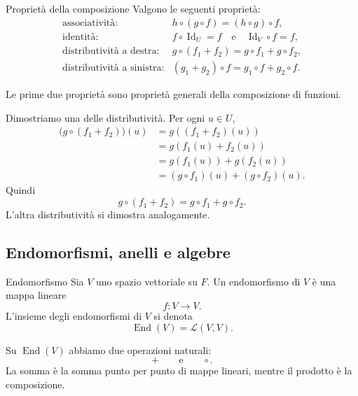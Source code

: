 \documentclass[a4paper]{article}
\begin{document}
\begin{snippetproposition}{Proprietà della composizione}
    Valgono le seguenti proprietà:
    \[
        \begin{array}{ll}
            \text{associatività:} &
            h\circ(g\circ f)=(h\circ g)\circ f,\\[2mm]
            \text{identità:} &
            f\circ\operatorname{Id}_U=f
            \quad\text{e}\quad
            \operatorname{Id}_V\circ f=f,\\[2mm]
            \text{distributività a destra:} &
            g\circ(f_1+f_2)=g\circ f_1+g\circ f_2,\\[2mm]
            \text{distributività a sinistra:} &
            (g_1+g_2)\circ f=g_1\circ f+g_2\circ f.
        \end{array}
    \]
\end{snippetproposition}

\begin{snippetproof}{}
    Le prime due proprietà sono proprietà generali della composizione di funzioni.

    Dimostriamo una delle distributività. Per ogni \(u\in U\),
    \begin{align*}
        \bigl(g\circ(f_1+f_2)\bigr)(u)
        &=g((f_1+f_2)(u))\\
        &=g(f_1(u)+f_2(u))\\
        &=g(f_1(u))+g(f_2(u))\\
        &=(g\circ f_1)(u)+(g\circ f_2)(u).
    \end{align*}
    Quindi
    \[
        g\circ(f_1+f_2)=g\circ f_1+g\circ f_2.
    \]
    L'altra distributività si dimostra analogamente.
\end{snippetproof}

\subsection{Endomorfismi, anelli e algebre}

\begin{snippetdefinition}{Endomorfismo}
    Sia \(V\) uno spazio vettoriale su \(F\). Un endomorfismo di \(V\) è una mappa lineare
    \[
        f:V\to V.
    \]
    L'insieme degli endomorfismi di \(V\) si denota
    \[
        \operatorname{End}(V)=\mathcal{L}(V,V).
    \]
\end{snippetdefinition}

Su \(\operatorname{End}(V)\) abbiamo due operazioni naturali:
\[
    + \qquad\text{e}\qquad \circ.
\]
La somma è la somma punto per punto di mappe lineari, mentre il prodotto è la composizione.
\end{document}
